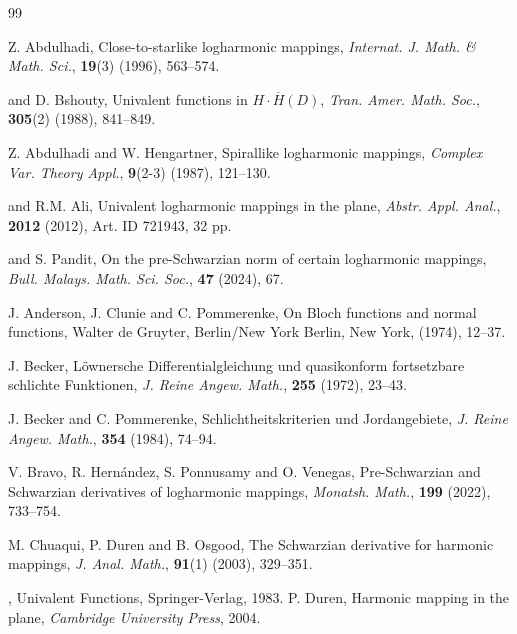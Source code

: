 \documentclass[12pt,reqno]{amsart}
\newtheorem{open problem}{Open problem}[section]
\numberwithin{equation}{section}
\begin{document}
\begin{thebibliography}{99}


 {\sc Z. Abdulhadi}, Close-to-starlike logharmonic mappings, {\it Internat. J. Math. \& Math. Sci.}, {\bf 19}(3) (1996), 563--574.

 and {\sc D. Bshouty}, Univalent functions in $H\cdot\overline{H}(D)$, {\it Tran. Amer. Math. Soc.}, {\bf 305}(2) (1988), 841--849.

 {\sc Z. Abdulhadi} and {\sc W. Hengartner}, Spirallike logharmonic mappings, {\it Complex Var. Theory Appl.}, {\bf 9}(2-3) (1987), 121--130.

 and {\sc R.M. Ali}, Univalent logharmonic mappings in the plane, {\it Abstr. Appl. Anal.}, {\bf 2012} (2012), Art. ID 721943, 32 pp.

 and {\sc S. Pandit}, On the pre-Schwarzian norm of certain logharmonic mappings, {\it Bull. Malays. Math. Sci. Soc.}, {\bf47} (2024), 67.

{\sc J. Anderson, J. Clunie} and {\sc C. Pommerenke}, On Bloch functions and normal functions, Walter de Gruyter, Berlin/New York Berlin, New York, (1974), 12--37.

{\sc J. Becker}, L\"{o}wnersche Differentialgleichung und quasikonform fortsetzbare schlichte Funktionen, {\it J. Reine Angew. Math.}, {\bf 255} (1972), 23--43.

{\sc J. Becker} and {\sc C. Pommerenke}, Schlichtheitskriterien und Jordangebiete, {\it J. Reine Angew. Math.}, {\bf 354} (1984), 74--94.

{\sc V. Bravo, R. Hern{\'a}ndez, S. Ponnusamy} and {\sc O. Venegas}, Pre-Schwarzian and Schwarzian derivatives of logharmonic mappings, {\it Monatsh. Math.}, {\bf199} (2022),  733--754.

{\sc M. Chuaqui, P. Duren} and {\sc B. Osgood}, The Schwarzian derivative for harmonic mappings, {\it J. Anal. Math.}, {\bf 91}(1) (2003), 329--351.

, Univalent Functions, Springer-Verlag, 1983.
 {\sc P. Duren}, Harmonic mapping in the plane, {\it Cambridge University Press}, 2004.



\end{thebibliography}
\end{document}
